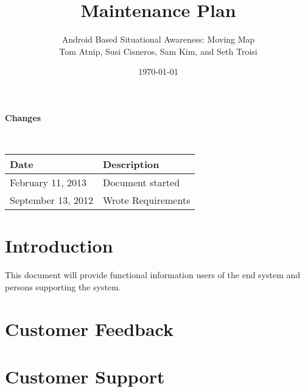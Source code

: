 \documentclass{article}
\begin{document}
\setlength{\voffset}{3.5in}
\title{Maintenance Plan}
\author{\Large Android Based Situational Awareness: Moving Map\\
Tom Atnip, Susi Cisneros, Sam Kim, and Seth Troisi}
\date{\today}
\maketitle
\clearpage
\setlength{\voffset}{0pt}
\tableofcontents
\clearpage


\begin{Large}
\textbf{Changes}
\end{Large}
\\

\begin{tabular}{ | p{1.5in} | p{4.5in} | }
\hline
\textbf{Date} & \textbf{Description}\\
\hline
\hline
February 11, 2013 & Document started\\
\hline
September 13, 2012 & Wrote Requirements\\
\hline
\end{tabular}
\clearpage

\section{Introduction}
This document will provide functional information users of the end system and persons supporting the system.

\section{Customer Feedback}

\section{Customer Support}
\end{document}
